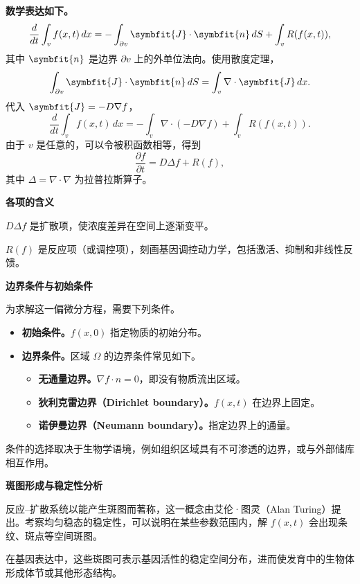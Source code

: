 \begin{enumerate}
  \textbf{数学表达如下。}
  \[
    \frac{d}{dt}\int_v f(x,t)\,dx
      =-\int_{\partial v}\symbfit{J}\cdot\symbfit{n}\,dS
        +\int_v R(f(x,t)),
  \]
  其中 $\symbfit{n}$ 是边界 $\partial v$ 上的外单位法向。使用散度定理，
  \[
    \int_{\partial v}\symbfit{J}\cdot\symbfit{n}\,dS
      =\int_v\nabla\cdot\symbfit{J}\,dx.
  \]
  代入 $\symbfit{J}=-D\nabla f$，
  \[
    \frac{d}{dt}\int_v f(x,t)\,dx
     =-\int_v\nabla\cdot(-D\nabla f)+\int_v R(f(x,t)).
  \]
  由于 $v$ 是任意的，可以令被积函数相等，得到
  \[
    \frac{\partial f}{\partial t}=D\Delta f+R(f),
  \]
  其中 $\Delta=\nabla\cdot\nabla$ 为拉普拉斯算子。
\end{enumerate}

\textbf{各项的含义}

$D\Delta f$ 是扩散项，使浓度差异在空间上逐渐变平。

$R(f)$ 是反应项（或调控项），刻画基因调控动力学，包括激活、抑制和非线性反馈。

\textbf{边界条件与初始条件}

为求解这一偏微分方程，需要下列条件。
\begin{itemize}
  \item \textbf{初始条件。}$f(x,0)$ 指定物质的初始分布。
  \item \textbf{边界条件。}区域 $\Omega$ 的边界条件常见如下。
  \begin{itemize}
    \item \textbf{无通量边界。}$\nabla f\cdot n=0$，即没有物质流出区域。
    \item \textbf{狄利克雷边界（Dirichlet boundary）。}$f(x,t)$ 在边界上固定。
    \item \textbf{诺伊曼边界（Neumann boundary）。}指定边界上的通量。
  \end{itemize}
\end{itemize}
条件的选择取决于生物学语境，例如组织区域具有不可渗透的边界，或与外部储库相互作用。

\textbf{斑图形成与稳定性分析}

反应–扩散系统以能产生斑图而著称，这一概念由艾伦·图灵（Alan Turing）提出。考察均匀稳态的稳定性，可以说明在某些参数范围内，解 $f(x,t)$ 会出现条纹、斑点等空间斑图。

在基因表达中，这些斑图可表示基因活性的稳定空间分布，进而使发育中的生物体形成体节或其他形态结构。

